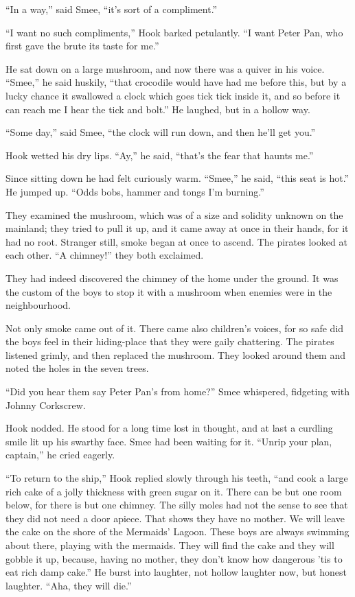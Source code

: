 “In a way,” said Smee, “it’s sort of a compliment.”

“I want no such compliments,” Hook barked petulantly.
“I want Peter Pan, who first gave the brute its taste for me.”

He sat down on a large mushroom, and now there was a quiver in his voice.
“Smee,” he said huskily, “that crocodile would have had me before this,
but by a lucky chance it swallowed a clock which goes tick tick inside it,
and so before it can reach me I hear the tick and bolt.”
He laughed, but in a hollow way.

“Some day,” said Smee, “the clock will run down, and then he’ll get you.”

Hook wetted his dry lips.
“Ay,” he said, “that’s the fear that haunts me.”

Since sitting down he had felt curiously warm.
“Smee,” he said, “this seat is hot.”
He jumped up.
“Odds bobs, hammer and tongs I’m burning.”

They examined the mushroom, which was of a size and solidity unknown on the mainland;
they tried to pull it up, and it came away at once in their hands, for it had no root.
Stranger still, smoke began at once to ascend.
The pirates looked at each other.
“A chimney!\@” they both exclaimed.

They had indeed discovered the chimney of the home under the ground.
It was the custom of the boys to stop it with a mushroom when enemies were in the neighbourhood.

Not only smoke came out of it.
There came also children’s voices,
for so safe did the boys feel in their hiding-place that they were gaily chattering.
The pirates listened grimly, and then replaced the mushroom.
They looked around them and noted the holes in the seven trees.

“Did you hear them say Peter Pan’s from home?\@” Smee whispered,
fidgeting with Johnny Corkscrew.

Hook nodded.
He stood for a long time lost in thought,
and at last a curdling smile lit up his swarthy face.
Smee had been waiting for it.
“Unrip your plan, captain,” he cried eagerly.

“To return to the ship,” Hook replied slowly through his teeth,
“and cook a large rich cake of a jolly thickness with green sugar on it.
There can be but one room below, for there is but one chimney.
The silly moles had not the sense to see that they did not need a door apiece.
That shows they have no mother.
We will leave the cake on the shore of the Mermaids’ Lagoon.
These boys are always swimming about there, playing with the mermaids.
They will find the cake and they will gobble it up,
because, having no mother, they don’t know how dangerous ’tis to eat rich damp cake.”
He burst into laughter, not hollow laughter now, but honest laughter.
“Aha, they will die.”

